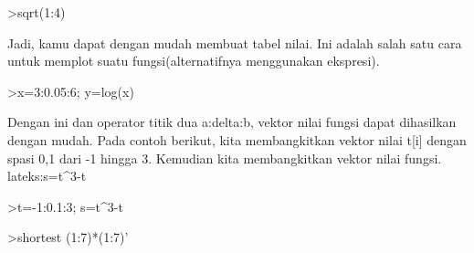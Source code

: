 \documentclass[a4paper,10pt]{article}
\begin{document}
\begin{eulernotebook}
\begin{eulercomment}
\begin{eulercomment}
\begin{eulercomment}
\begin{eulercomment}
\begin{eulercomment}
\end{eulercomment}
\begin{eulerprompt}
>sqrt(1:4)
\end{eulerprompt}
\begin{euleroutput}
  [1,  1.41421,  1.73205,  2]
\end{euleroutput}
\begin{eulercomment}
Jadi, kamu dapat dengan mudah membuat tabel nilai. Ini adalah salah
satu cara untuk memplot suatu fungsi(alternatifnya menggunakan
ekspresi).
\end{eulercomment}
\begin{eulerprompt}
>x=3:0.05:6; y=log(x)
\end{eulerprompt}
\begin{euleroutput}
  [1.09861,  1.11514,  1.1314,  1.1474,  1.16315,  1.17865,  1.19392,
  1.20896,  1.22378,  1.23837,  1.25276,  1.26695,  1.28093,  1.29473,
  1.30833,  1.32176,  1.335,  1.34807,  1.36098,  1.37372,  1.38629,
  1.39872,  1.41099,  1.42311,  1.43508,  1.44692,  1.45862,  1.47018,
  1.4816,  1.4929,  1.50408,  1.51513,  1.52606,  1.53687,  1.54756,
  1.55814,  1.56862,  1.57898,  1.58924,  1.59939,  1.60944,  1.61939,
  1.62924,  1.639,  1.64866,  1.65823,  1.66771,  1.6771,  1.6864,
  1.69562,  1.70475,  1.7138,  1.72277,  1.73166,  1.74047,  1.7492,
  1.75786,  1.76644,  1.77495,  1.78339,  1.79176]
\end{euleroutput}
\begin{eulercomment}
Dengan ini dan operator titik dua a:delta:b, vektor nilai fungsi dapat
dihasilkan dengan mudah. Pada contoh berikut, kita membangkitkan
vektor nilai t[i] dengan spasi 0,1 dari -1 hingga 3. Kemudian kita
membangkitkan vektor nilai fungsi.\\
lateks:s=t\textasciicircum{}3-t
\end{eulercomment}
\begin{eulerprompt}
>t=-1:0.1:3; s=t^3-t
\end{eulerprompt}
\begin{euleroutput}
  [0,  0.171,  0.288,  0.357,  0.384,  0.375,  0.336,  0.273,  0.192,
  0.099,  0,  -0.099,  -0.192,  -0.273,  -0.336,  -0.375,  -0.384,
  -0.357,  -0.288,  -0.171,  0,  0.231,  0.528,  0.897,  1.344,  1.875,
  2.496,  3.213,  4.032,  4.959,  6,  7.161,  8.448,  9.867,  11.424,
  13.125,  14.976,  16.983,  19.152,  21.489,  24]
\end{euleroutput}
\begin{eulerprompt}
>shortest (1:7)*(1:7)'
\end{eulerprompt}

\end{eulercomment}
\end{eulercomment}
\end{eulercomment}
\end{eulercomment}
\end{eulernotebook}
\end{document}
